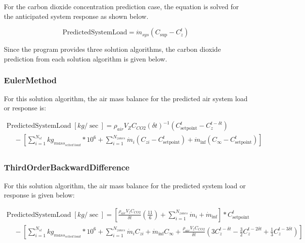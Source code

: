 For the carbon dioxide concentration prediction case, the equation is solved for the anticipated system response as shown below.

\begin{equation}
{\mathrm{PredictedSystemLoad}} = {\dot m_{sys}}\left( {{C_{\sup }} - C_z^t} \right)
\end{equation}

Since the program provides three solution algorithms, the carbon dioxide prediction from each solution algorithm is given below.

\subsubsection{EulerMethod}\label{eulermethod}

For this solution algorithm, the air mass balance for the predicted air system load or response is:

\begin{equation}
\begin{array}{l}{\mathrm{PredictedSystemLoad}}\;[kg/\sec ] = {\rho_{air}}{V_Z}{C_{CO2}}{\left( {\delta t} \right)^{ - 1}}\left( {C_{{\mathrm{setpoint}}}^t - C_z^{t - \delta t}} \right)\\\;\;\;\; - \left[ {\sum\limits_{i = 1}^{{N_{sl}}} {k{g_{mas{s_{sched\;load}}}}} *{{10}^6} + \sum\limits_{i = 1}^{{N_{zones}}} {{{\dot m}_i}} \left( {{C_{zi}} - C_{{\mathrm{setpoint}}}^t} \right) + {{\dot m}_{\inf }}\left( {{C_\infty } - C_{{\mathrm{setpoint}}}^t} \right)} \right]\\\;\;\;\;\;\;\;\;\;\;\;\;\;\;\;\;\;\;\;\;\;\;\;\;\;\;\;\;\;\;\;\;\;\;\;\end{array}
\end{equation}

\subsubsection{ThirdOrderBackwardDifference}\label{thirdorderbackwarddifference}

For this solution algorithm, the air mass balance for the predicted system load or response is given below:

\begin{equation}
\begin{array}{l}{\mathrm{PredictedSystemLoad}}\;[kg/\sec ] = \left[ {\frac{{{\rho_{air}}{V_z}{C_{CO2}}}}{{\delta t}}\left( {\frac{{11}}{6}} \right) + \sum\limits_{i = 1}^{{N_{zones}}} {{{\dot m}_i}}  + {{\dot m}_{\inf }}} \right]*C_{{\mathrm{setpoint}}}^t\\\;\;\;\; - \left[ {\sum\limits_{i = 1}^{{N_{sl}}} {k{g_{mas{s_{sched\;load}}}}*{{10}^6}}  + \sum\limits_{i = 1}^{{N_{zones}}} {{{\dot m}_i}} {C_{zi}} + {{\dot m}_{\inf }}{C_\infty } + \frac{{{\rho_{air}}{V_z}{C_{CO2}}}}{{\delta t}}\left( {3C_z^{t - \delta t} - \frac{3}{2}C_z^{t - 2\delta t} + \frac{1}{3}C_z^{t - 3\delta t}} \right)} \right]\\\;\;\;\;\;\;\;\;\;\;\;\;\;\;\;\;\;\;\;\;\;\;\;\;\;\;\;\;\;\;\;\;\;\;\;\end{array}
\end{equation}

